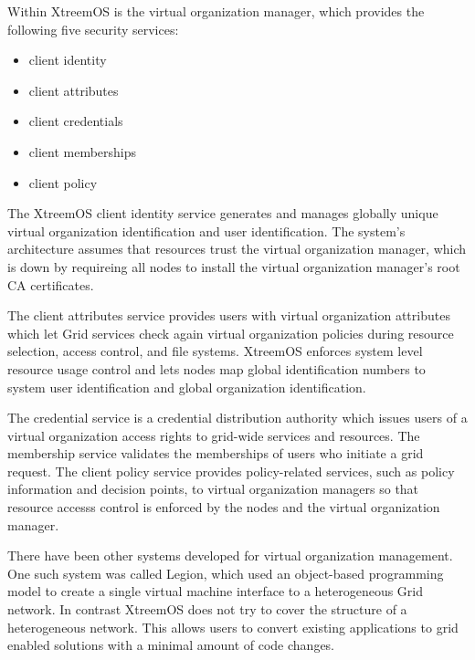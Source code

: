 \documentclass[conference]{IEEEtran}
\begin{document}
Within XtreemOS is the virtual organization manager, which provides the following five security services:

\begin{itemize}
\item client identity
\item client attributes
\item client credentials
\item client memberships
\item client policy
\end{itemize}

The XtreemOS client identity service generates and manages globally unique virtual organization identification and user identification. The system's architecture assumes that resources trust the virtual organization manager, which is down by requireing all nodes to install the virtual organization manager's root CA certificates. 

The client attributes service provides users with virtual organization attributes which let Grid services check again virtual organization policies during resource selection, access control, and file systems. XtreemOS enforces system level resource usage control and lets nodes map global identification numbers to system user identification and global organization identification. 

The credential service is a credential distribution authority which issues users of a virtual organization access rights to grid-wide services and resources. The membership service validates the memberships of users who initiate a grid request. The client policy service provides policy-related services, such as policy information and decision points, to virtual organization managers so that resource accesss control is enforced by the nodes and the virtual organization manager. 

There have been other systems developed for virtual organization management. One such system was called Legion, which used an object-based programming model to create a single virtual machine interface to a heterogeneous Grid network. In contrast XtreemOS does not try to cover the structure of a heterogeneous network. This allows users to convert existing applications to grid enabled solutions with a minimal amount of code changes. 
\end{document}
